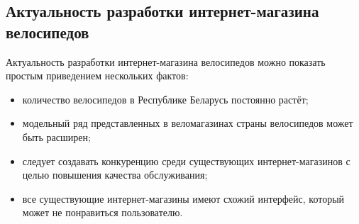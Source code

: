 \subsection{Актуальность разработки интернет-магазина \\ велосипедов}

Актуальность разработки интернет-магазина велосипедов можно показать
простым приведением нескольких фактов: 

\begin{itemize}
  \item количество велосипедов в Республике Беларусь постоянно растёт; 
  \item модельный ряд представленных в веломагазинах страны велосипедов
    может быть расширен;
  \item следует создавать конкуренцию среди существующих интернет-магазинов с
    целью повышения качества обслуживания; 
  \item все существующие интернет-магазины имеют схожий интерфейс, который
    может не понравиться пользователю.
\end{itemize}

\pagebreak
